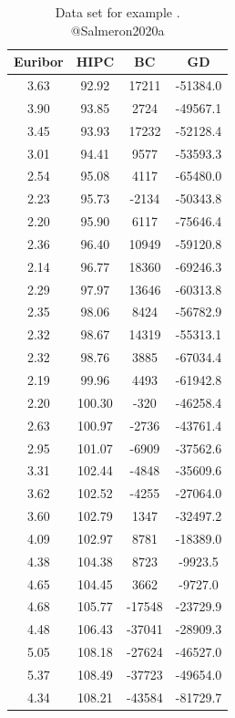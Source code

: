 \begin{table}

\caption{\label{tab:Example1Datalatex}Data set for example . @Salmeron2020a}
\centering
\begin{tabular}[t]{c|c|c|c}
\hline
Euribor & HIPC & BC & GD\\
\hline
3.63 & 92.92 & 17211 & -51384.0\\
\hline
3.90 & 93.85 & 2724 & -49567.1\\
\hline
3.45 & 93.93 & 17232 & -52128.4\\
\hline
3.01 & 94.41 & 9577 & -53593.3\\
\hline
2.54 & 95.08 & 4117 & -65480.0\\
\hline
2.23 & 95.73 & -2134 & -50343.8\\
\hline
2.20 & 95.90 & 6117 & -75646.4\\
\hline
2.36 & 96.40 & 10949 & -59120.8\\
\hline
2.14 & 96.77 & 18360 & -69246.3\\
\hline
2.29 & 97.97 & 13646 & -60313.8\\
\hline
2.35 & 98.06 & 8424 & -56782.9\\
\hline
2.32 & 98.67 & 14319 & -55313.1\\
\hline
2.32 & 98.76 & 3885 & -67034.4\\
\hline
2.19 & 99.96 & 4493 & -61942.8\\
\hline
2.20 & 100.30 & -320 & -46258.4\\
\hline
2.63 & 100.97 & -2736 & -43761.4\\
\hline
2.95 & 101.07 & -6909 & -37562.6\\
\hline
3.31 & 102.44 & -4848 & -35609.6\\
\hline
3.62 & 102.52 & -4255 & -27064.0\\
\hline
3.60 & 102.79 & 1347 & -32497.2\\
\hline
4.09 & 102.97 & 8781 & -18389.0\\
\hline
4.38 & 104.38 & 8723 & -9923.5\\
\hline
4.65 & 104.45 & 3662 & -9727.0\\
\hline
4.68 & 105.77 & -17548 & -23729.9\\
\hline
4.48 & 106.43 & -37041 & -28909.3\\
\hline
5.05 & 108.18 & -27624 & -46527.0\\
\hline
5.37 & 108.49 & -37723 & -49654.0\\
\hline
4.34 & 108.21 & -43584 & -81729.7\\
\hline

\end{tabular}
\end{table}
